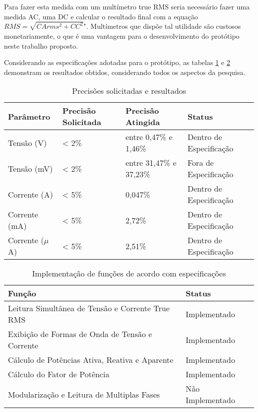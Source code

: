 Para fazer esta medida com um multímetro true RMS seria necessário fazer uma medida AC, uma DC e calcular o resultado final com a equação $RMS=\sqrt{CArms^2+CC^2}$". Multímetros que dispõe tal utilidade são custosos monetariamente, o que é uma vantagem para o desenvolvimento do protótipo neste trabalho proposto. 

Considerando as especificações adotadas para o protótipo, as tabelas \ref{tab:resultados-precis} e \ref{tab:resultados-func} demonstram os resultados obtidos, considerando todos os aspectos da pesquisa.

\begin{table}[!h]
    \centering
    \caption{Precisões solicitadas e resultados}
    \vspace*{5mm}
    \label{tab:resultados-precis}
    \begin{tabular}{ l l l l }
        \hline
        \textbf{Parâmetro} & \textbf{Precisão Solicitada} & \textbf{Precisão Atingida} & \textbf{Status}         \\ \hline
        Tensão (V)         & < 2\%                        & entre 0,47\% e 1,46\%      & Dentro de Especificação \\ 
        Tensão (mV)        & < 2\%                        & entre 31,47\% e 37,23\%    & Fora de Especificação   \\ 
        Corrente (A)       & < 5\%                        & 0,047\%                    & Dentro de Especificação \\ 
        Corrente (mA)      & < 5\%                        & 2,72\%                     & Dentro de Especificação  \\ 
        Corrente ($\mu$A)  & < 5\%                        & 2,51\%                     & Dentro de Especificação   \\ \hline
    \end{tabular}
    \fonte{}
\end{table}

\begin{table}[!h]
    \centering
    \caption{Implementação de funções de acordo com especificações}
    \vspace*{5mm}
    \label{tab:resultados-func}
    \begin{tabular}{ l l }
        \hline
        \textbf{Função}                                  & \textbf{Status} \\ \hline
        Leitura Simultânea de Tensão e Corrente True RMS & Implementado  \\ 
        Exibição de Formas de Onda de Tensão e Corrente  & Implementado  \\ 
        Cálculo de Potências Ativa, Reativa e Aparente   & Implementado  \\ 
        Cálculo do Fator de Potência                     & Implementado  \\ \hline
        Modularização e Leitura de Multiplas Fases       & Não Implementado  \\ \hline
    \end{tabular}
    \fonte{}
\end{table}

